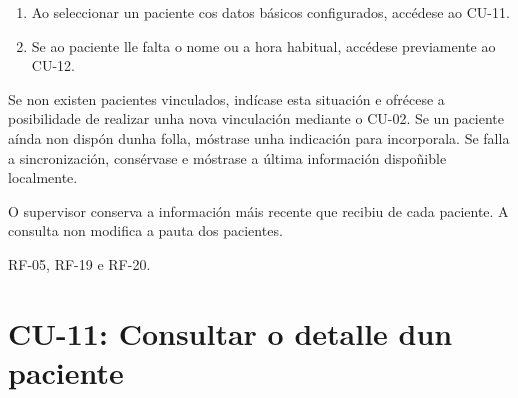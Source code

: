 \begin{description}
\begin{enumerate}
    \item Ao seleccionar un paciente cos datos básicos configurados, accédese
    ao CU-11.

    \item Se ao paciente lle falta o nome ou a hora habitual, accédese previamente
    ao CU-12.
\end{enumerate}

\item[Fluxos alternativos:] Se non existen pacientes vinculados, indícase esta
situación e ofrécese a posibilidade de realizar unha nova vinculación mediante
o CU-02. Se un paciente aínda non dispón dunha folla, móstrase unha indicación
para incorporala. Se falla a sincronización, consérvase e móstrase a última
información dispoñible localmente.

\item[Postcondicións:] O supervisor conserva a información máis recente que
recibiu de cada paciente. A consulta non modifica a pauta dos pacientes.

\item[Requisitos relacionados:] RF-05, RF-19 e RF-20.

\end{description}



\section{CU-11: Consultar o detalle dun paciente}
\label{cu:consultar-detalle-paciente}

